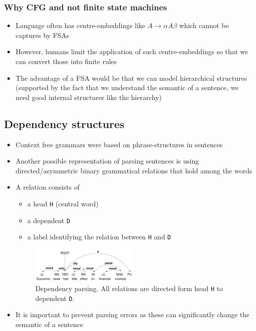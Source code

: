 \subsubsection{Why CFG and not finite state machines}
\begin{itemize}
	\item Language often has centre-embeddings like $A\to \alpha A \beta$ which cannot be captures by FSAs
	\item However, humans limit the application of such centre-embeddings so that we can convert those into finite rules
	\item The advantage of a FSA would be that we can model hierarchical structures (supported by the fact that we understand the semantic of a sentence, we need good internal structures like the hierarchy)
\end{itemize}
\subsection{Dependency structures}
\begin{itemize}
	\item Context free grammars were based on phrase-structures in sentences
	\item Another possible representation of parsing sentences is using directed/asymmetric binary grammatical relations that hold among the words 
	\item A relation consists of 
	\begin{itemize}
		\item a head \texttt{H} (central word)
		\item a dependent \texttt{D}
		\item a label identifying the relation between \texttt{H} and \texttt{D}
	\end{itemize}
	\begin{figure}[ht]
		\centering
		\includegraphics[width=0.5\textwidth]{figures/dependency_parsing.png}
		\caption{Dependency parsing. All relations are directed form head \texttt{H} to dependent \texttt{D}.}
		\label{fig:dependency_parsing}
	\end{figure}
	\item It is important to prevent parsing errors as these can significantly change the semantic of a sentence
\end{itemize}